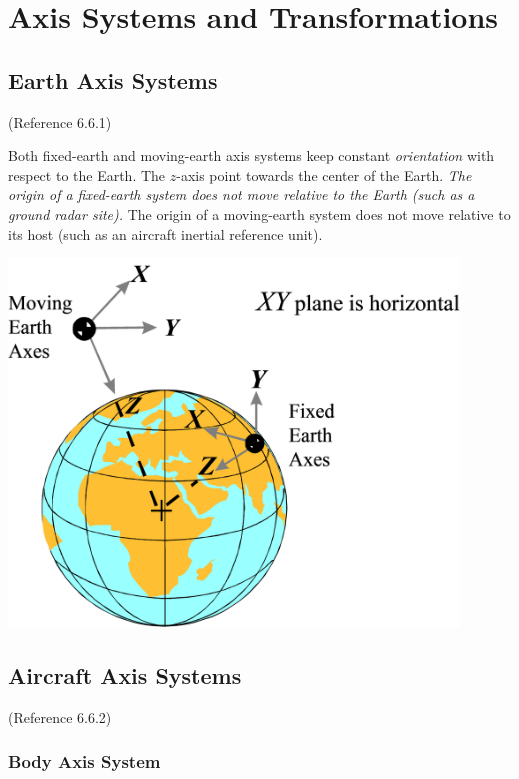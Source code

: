 \documentclass[
]{book}
\begin{document}
\hypertarget{axis-systems-and-transformations}{%
\chapter{Axis Systems and Transformations}\label{axis-systems-and-transformations}}

\hypertarget{earth-axis-systems}{%
\section{Earth Axis Systems}\label{earth-axis-systems}}

(Reference 6.6.1)

Both fixed-earth and moving-earth axis systems keep constant \emph{orientation} with respect to the Earth. The \(z\)-axis point towards the center of the Earth.
\emph{The origin of a fixed-earth system does not move relative to the Earth (such as a ground radar site).
}The origin of a moving-earth system does not move relative to its host (such as an aircraft inertial reference unit).

\includegraphics[width=4.70903in,height=3.83958in]{media/06/image1.svg}

\hypertarget{aircraft-axis-systems}{%
\section{Aircraft Axis Systems}\label{aircraft-axis-systems}}

(Reference 6.6.2)

\hypertarget{body-axis-system}{%
\subsection{Body Axis System}\label{body-axis-system}}
\end{document}
